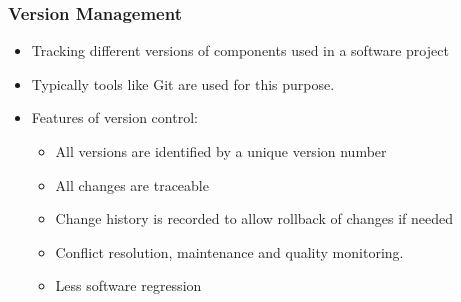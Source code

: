 \documentclass{article}
\begin{document}
\subsubsection{Version Management}
\begin{itemize}
    \item Tracking different versions of components used in a software project
    
    \item Typically tools like Git are used for this purpose.
    
    \item Features of version control:
    \begin{itemize}
        \item All versions are identified by a unique version number
        
        \item All changes are traceable
        
        \item Change history is recorded to allow rollback of changes if needed
        
        \item Conflict resolution, maintenance and quality monitoring. 
        
        \item Less software regression 
    \end{itemize}
\end{itemize}
\end{document}
